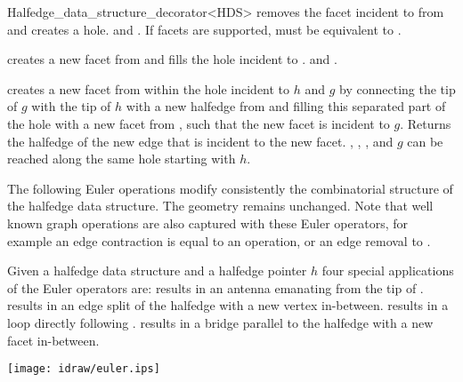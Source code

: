 \begin{ccClassTemplate}{Halfedge_data_structure_decorator<HDS>}
   {removes the facet incident to  from  and creates a hole.
    \ccPrecond {} and . If facets
   are supported,  must be equivalent to
   .}

   {creates a new facet from  and fills the hole incident to .
    \ccPrecond {} and .}

   {creates a new facet from  within the hole incident to $h$
   and $g$ by connecting the tip of $g$ with the tip of $h$ 
   with a new halfedge from  and filling this separated part
   of the hole with a new facet from , such that the new
   facet is incident to $g$. Returns the halfedge of the new edge that
   is incident to the new facet.
    \ccPrecond {}, , ,
     and $g$ can be reached along the same hole
   starting with $h$.}



The following Euler operations modify consistently the combinatorial
structure of the halfedge data structure. The geometry remains unchanged.
Note that well known graph operations are also captured with these 
Euler operators, for example an edge contraction is equal to an
 operation, or an edge removal to .

Given a halfedge data structure  and a halfedge pointer $h$
four special applications of the Euler operators are:
 results in an antenna emanating from the tip
of .
 results in an edge split
of the halfedge  with a new vertex in-between.
 results in a loop directly following .
 results in a bridge parallel to
the halfedge  with a new facet in-between.


\begin{ccTexOnly}
    \begin{center}
      \parbox{\textwidth}{%
          \texttt{[image: idraw/euler.ips]}%
      }
    \end{center}
\end{ccTexOnly}


\end{ccClassTemplate}
